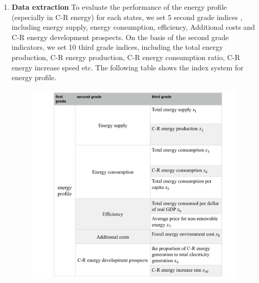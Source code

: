 \documentclass{mcmthesis}
\begin{document}
        \begin{enumerate}
          \item \textbf{Data extraction}
            To evaluate the performance of the energy profile (especially in C-R energy) for each states, we set 5 second grade indices , including energy supply, energy consumption, efficiency, Additional costs and C-R energy development prospects. On the basis of the second grade indicators, we set 10 third grade indices, including the total energy production, C-R energy production, C-R energy consumption ratio, C-R energy increase speed etc. The following table shows the index system for energy profile.

            \begin{figure}
              \centering
              \includegraphics[width=400px]{ener.png}
            \end{figure}


\end{enumerate}
\end{document}
